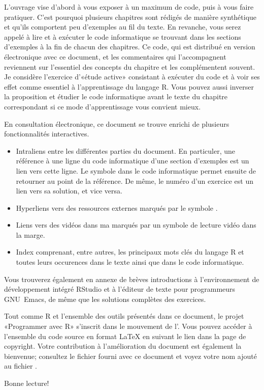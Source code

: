L'ouvrage vise d'abord à vous exposer à un maximum de code, puis à
vous faire pratiquer. C'est pourquoi plusieurs chapitres sont rédigés
de manière synthétique et qu'ils comportent peu d'exemples au fil du
texte. En revanche, vous serez appelé à lire et à exécuter le code
informatique se trouvant dans les sections d'exemples à la fin de
chacun des chapitres. Ce code, qui est distribué en version
électronique avec ce document, et les commentaires qui l'accompagnent
reviennent sur l'essentiel des concepts du chapitre et les
complémentent souvent. Je considère l'exercice d'«étude active»
consistant à exécuter du code et à voir ses effet comme essentiel à
l'apprentissage du langage R. Vous pouvez aussi inverser la
proposition et étudier le code informatique avant le texte du chapitre
correspondant si ce mode d'apprentissage vous convient mieux.

En consultation électronique, ce document se trouve enrichi de
plusieurs fonctionnalités interactives.
\begin{itemize}
\item Intraliens entre les différentes parties du document. En
  particuler, une référence à une ligne du code informatique d'une
  section d'exemples est un lien vers cette ligne. Le symbole
  {\smaller\gotorsign} dans le code informatique permet ensuite de
  retourner au point de la référence. De même, le numéro d'un exercice
  est un lien vers sa solution, et vice versa.
\item Hyperliens vers des ressources externes marqués par le symbole
  {\smaller\faExternalLink}.
\item Liens vers des vidéos dans ma %
  marqués par un symbole de lecture vidéo {\smaller\faYoutubePlay} dans la
  marge.
\item Index comprenant, entre autres, les principaux mots clés du
  langage R et toutes leurs occurences dans le texte ainsi que
  dans le code informatique.
\end{itemize}

Vous trouverez également en annexe de brèves introductions à
l'environnement de développement intégré RStudio et à l'éditeur de
texte pour programmeurs GNU~Emacs, de même que les solutions complètes
des exercices.

Tout comme R et l'ensemble des outils présentés dans ce document, le
projet «Programmer avec R» s'inscrit dans le mouvement de
l'. Vous pouvez accéder à l'ensemble du code source en format
{\LaTeX} en suivant le lien dans la page de copyright. Votre
contribution à l'amélioration du document est également la bienvenue;
consultez le fichier  fourni avec ce document
et voyez votre nom ajouté au fichier .

Bonne lecture!

